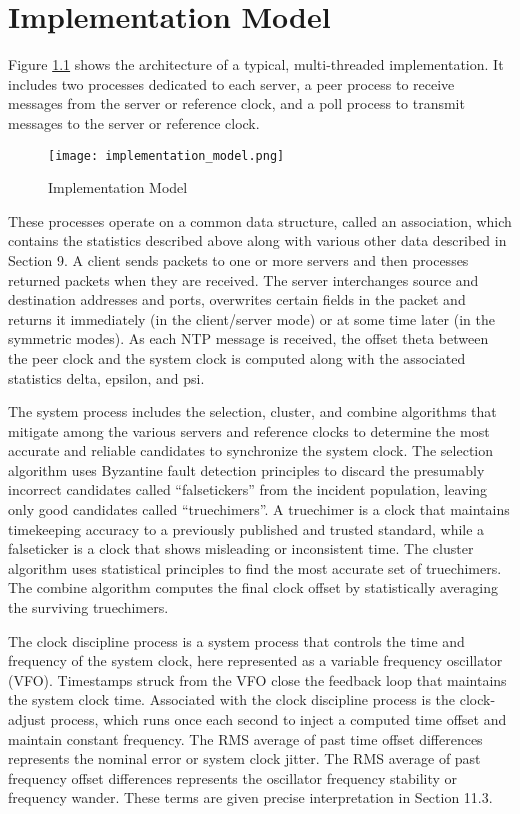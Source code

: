 \chapter{Implementation Model}

Figure \ref{implementation_model} shows the architecture of a typical, multi-threaded
implementation. It includes two processes dedicated to each server,
a peer process to receive messages from the server or reference
clock, and a poll process to transmit messages to the server or
reference clock.

\begin{figure}
\centering
\texttt{[image: implementation\_model.png]}
\caption{Implementation Model}
\label{implementation_model}
\end{figure}

These processes operate on a common data structure, called an
association, which contains the statistics described above along with
various other data described in Section 9. A client sends packets to
one or more servers and then processes returned packets when they are
received. The server interchanges source and destination addresses
and ports, overwrites certain fields in the packet and returns it
immediately (in the client/server mode) or at some time later (in the
symmetric modes). As each NTP message is received, the offset theta
between the peer clock and the system clock is computed along with
the associated statistics delta, epsilon, and psi.

The system process includes the selection, cluster, and combine
algorithms that mitigate among the various servers and reference
clocks to determine the most accurate and reliable candidates to
synchronize the system clock. The selection algorithm uses Byzantine
fault detection principles to discard the presumably incorrect
candidates called ``falsetickers'' from the incident population,
leaving only good candidates called ``truechimers''. A truechimer is a
clock that maintains timekeeping accuracy to a previously published
and trusted standard, while a falseticker is a clock that shows
misleading or inconsistent time. The cluster algorithm uses
statistical principles to find the most accurate set of truechimers.
The combine algorithm computes the final clock offset by
statistically averaging the surviving truechimers.

The clock discipline process is a system process that controls the
time and frequency of the system clock, here represented as a
variable frequency oscillator (VFO). Timestamps struck from the VFO
close the feedback loop that maintains the system clock time.
Associated with the clock discipline process is the clock-adjust
process, which runs once each second to inject a computed time offset
and maintain constant frequency. The RMS average of past time offset
differences represents the nominal error or system clock jitter. The
RMS average of past frequency offset differences represents the
oscillator frequency stability or frequency wander. These terms are
given precise interpretation in Section 11.3.

